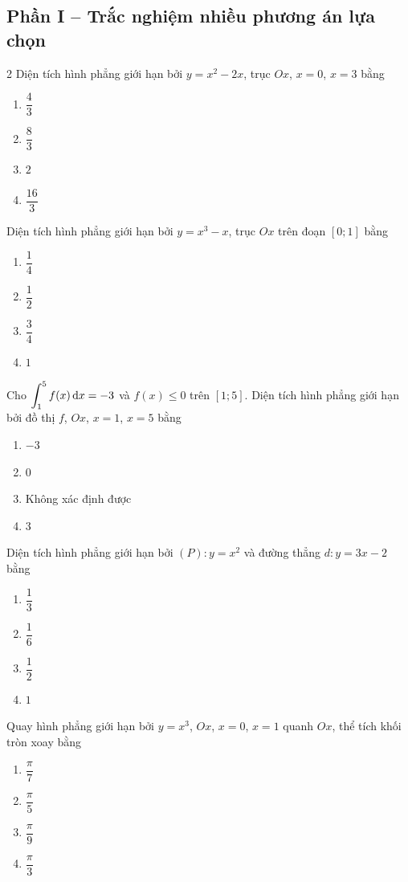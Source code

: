 \newpage
\subsection{Phần I -- Trắc nghiệm nhiều phương án lựa chọn}

\begin{multicols}{2}
\cauhoi Diện tích hình phẳng giới hạn bởi $y=x^2-2x$, trục $Ox$, $x=0$, $x=3$ bằng
\begin{enumerate}[label=\textbf{\Alph*.}, leftmargin=0.9cm]
  \item $\dfrac43$
  \item $\dfrac83$
  \item $2$
  \item $\dfrac{16}{3}$
\end{enumerate}

\cauhoi Diện tích hình phẳng giới hạn bởi $y=x^3-x$, trục $Ox$ trên đoạn $[0;1]$ bằng
\begin{enumerate}[label=\textbf{\Alph*.}, leftmargin=0.9cm]
  \item $\dfrac14$
  \item $\dfrac12$
  \item $\dfrac34$
  \item $1$
\end{enumerate}

\cauhoi Cho $\displaystyle\int_1^5 f(x)\,\mathrm{d}x=-3$ và $f(x)\le0$ trên $[1;5]$. Diện tích hình phẳng giới hạn bởi đồ thị $f$, $Ox$, $x=1$, $x=5$ bằng
\begin{enumerate}[label=\textbf{\Alph*.}, leftmargin=0.9cm]
  \item $-3$
  \item $0$
  \item Không xác định được
  \item $3$
\end{enumerate}

\cauhoi Diện tích hình phẳng giới hạn bởi $(P):y=x^2$ và đường thẳng $d:y=3x-2$ bằng
\begin{enumerate}[label=\textbf{\Alph*.}, leftmargin=0.9cm]
  \item $\dfrac13$
  \item $\dfrac16$
  \item $\dfrac12$
  \item $1$
\end{enumerate}

\cauhoi Quay hình phẳng giới hạn bởi $y=x^3$, $Ox$, $x=0$, $x=1$ quanh $Ox$, thể tích khối tròn xoay bằng
\begin{enumerate}[label=\textbf{\Alph*.}, leftmargin=0.9cm]
  \item $\dfrac{\pi}{7}$
  \item $\dfrac{\pi}{5}$
  \item $\dfrac{\pi}{9}$
  \item $\dfrac{\pi}{3}$
\end{enumerate}


\end{multicols}
